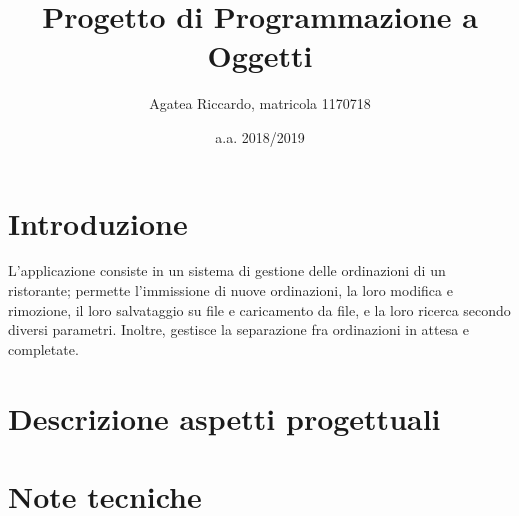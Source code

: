 \documentclass[10pt]{article}
\title{Progetto di Programmazione a Oggetti}
\author{Agatea Riccardo, matricola 1170718}
\date{a.a. 2018/2019}
\theoremstyle{remark}
\begin{document}
\maketitle
\section{Introduzione} %
\label{sec:introduzione}
L'applicazione consiste in un sistema di gestione delle ordinazioni di un ristorante; permette l'immissione di nuove ordinazioni, la loro modifica e rimozione, il loro salvataggio su file e caricamento da file, e la loro ricerca secondo diversi parametri. Inoltre, gestisce la separazione fra ordinazioni in attesa e completate.
\section{Descrizione aspetti progettuali} %
\label{sec:descrizione_aspetti_progettuali}





\section{Note tecniche} %
\label{sec:note_tecniche}



\end{document}
